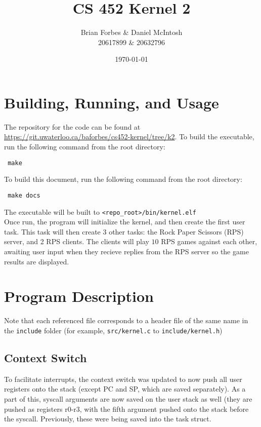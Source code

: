 \documentclass{article}
\begin{document}
\title{CS 452 Kernel 2}
\author{Brian Forbes \& Daniel McIntosh \\ 20617899 \& 20632796}
\date{\today}

\maketitle

\section{Building, Running, and Usage}

The repository for the code can be found at \url{https://git.uwaterloo.ca/baforbes/cs452-kernel/tree/k2}.
To build the executable, run the following command from the root directory: \begin{verbatim} make \end{verbatim}
To build this document, run the following command from the root directory: \begin{verbatim} make docs \end{verbatim}
The executable will be built to \verb|<repo_root>/bin/kernel.elf|\\

Once run, the program will initialize the kernel, and then create the first user task. This task will then create 3 other tasks: the Rock Paper Scissors (RPS) server, and 2 RPS clients. The clients will play $10$ RPS games against each other, awaiting user input when they recieve replies from the RPS server so the game results are displayed.

\section{Program Description}
Note that each referenced file corresponds to a header file of the same name in the \verb|include| folder (for example, \verb|src/kernel.c| to \verb|include/kernel.h|)
\subsection{Context Switch}
    To facilitate interrupts, the context switch was updated to now push all user registers onto the stack (except PC and SP, which are saved separately). As a part of this, syscall arguments are now saved on the user stack as well (they are pushed as registers r0-r3, with the fifth argument pushed onto the stack before the syscall. Previously, these were being saved into the task struct.
\end{document}
